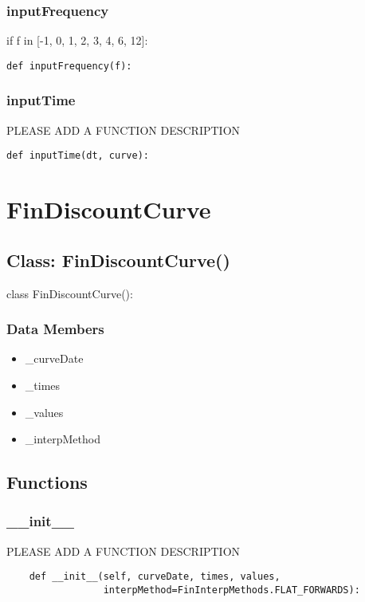 \documentclass[twoside,11pt]{book}
\begin{document}
\subsubsection*{{\bf inputFrequency}}
if f in [-1, 0, 1, 2, 3, 4, 6, 12]: 

\begin{lstlisting}
def inputFrequency(f):
\end{lstlisting}

\subsubsection*{{\bf inputTime}}
PLEASE ADD A FUNCTION DESCRIPTION

\begin{lstlisting}
def inputTime(dt, curve):
\end{lstlisting}

\newpage
\section{FinDiscountCurve}

\subsection*{Class: FinDiscountCurve()}
class FinDiscountCurve(): 

\subsubsection*{Data Members}
\begin{itemize}
\item{\_curveDate}
\item{\_times}
\item{\_values}
\item{\_interpMethod}
\end{itemize}

\subsection*{Functions}

\subsubsection*{{\bf \_\_init\_\_}}
PLEASE ADD A FUNCTION DESCRIPTION

\begin{lstlisting}
    def __init__(self, curveDate, times, values,
                 interpMethod=FinInterpMethods.FLAT_FORWARDS):
\end{lstlisting}
\end{document}
